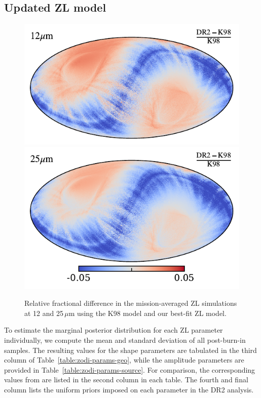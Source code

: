 \documentclass[twocolumn]{aa}
\begin{document}
\subsection{Updated ZL model}

\begin{figure}
    \centering
    \includegraphics[width=\columnwidth]{figs/zodi_diff_map_05.pdf}\\
    \includegraphics[width=\columnwidth]{figs/zodi_diff_map_06.pdf}
    \caption{Relative fractional difference in the mission-averaged ZL
      simulations at 12 and 25\,$\mu$m using the K98 model and our best-fit ZL
      model.}
    \label{fig:reldiff}
\end{figure}

To estimate the marginal posterior distribution for each ZL parameter
individually, we compute the mean and standard deviation of all
post-burn-in samples. The resulting values for the shape parameters
are tabulated in the third column of
Table~\ref{table:zodi-params-geo}, while the amplitude parameters are
provided in Table~\ref{table:zodi-params-source}. For comparison, the
corresponding values from \citet{Kelsall1998} are listed in the second
column in each table. The fourth and final column lists the uniform
priors imposed on each parameter in the DR2 analysis.
\end{document}
